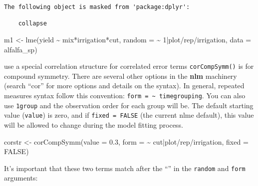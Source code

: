 \documentclass[
  letterpaper,
  DIV=11,
  numbers=noendperiod]{scrreprt}
\newenvironment{Shaded}{\begin{snugshade}}{\end{snugshade}}
\newcommand{\AttributeTok}[1]{\textcolor[rgb]{0.40,0.45,0.13}{#1}}
\newcommand{\ConstantTok}[1]{\textcolor[rgb]{0.56,0.35,0.01}{#1}}
\newcommand{\DecValTok}[1]{\textcolor[rgb]{0.68,0.00,0.00}{#1}}
\newcommand{\FloatTok}[1]{\textcolor[rgb]{0.68,0.00,0.00}{#1}}
\newcommand{\FunctionTok}[1]{\textcolor[rgb]{0.28,0.35,0.67}{#1}}
\newcommand{\NormalTok}[1]{\textcolor[rgb]{0.00,0.23,0.31}{#1}}
\newcommand{\OtherTok}[1]{\textcolor[rgb]{0.00,0.23,0.31}{#1}}
\newcommand{\SpecialCharTok}[1]{\textcolor[rgb]{0.37,0.37,0.37}{#1}}
\begin{document}
\begin{verbatim}
The following object is masked from 'package:dplyr':

    collapse
\end{verbatim}

\begin{Shaded}
\begin{Highlighting}[]
\NormalTok{m1 }\OtherTok{\textless{}{-}} \FunctionTok{lme}\NormalTok{(yield }\SpecialCharTok{\textasciitilde{}}\NormalTok{ mix}\SpecialCharTok{*}\NormalTok{irrigation}\SpecialCharTok{*}\NormalTok{cut,}
          \AttributeTok{random =} \SpecialCharTok{\textasciitilde{}} \DecValTok{1}\SpecialCharTok{|}\NormalTok{plot}\SpecialCharTok{/}\NormalTok{rep}\SpecialCharTok{/}\NormalTok{irrigation,}
          \AttributeTok{data =}\NormalTok{ alfalfa\_sp)}
\end{Highlighting}
\end{Shaded}

use a special correlation structure for correlated error terms
\texttt{corCompSymm()} is for compound symmetry. There are several other
options in the \textbf{nlm} machinery (search ``cor'' for more options
and details on the syntax). In general, repeated measures syntax follow
this convention:
\texttt{form\ =\ \textasciitilde{}\ time\textbar{}grouping}. You can
also use \texttt{1\textbar{}group} and the observation order for each
group will be. The default starting value (\texttt{value}) is zero, and
if \texttt{fixed\ =\ FALSE} (the current nlme default), this value will
be allowed to change during the model fitting process.

\begin{Shaded}
\begin{Highlighting}[]
\NormalTok{corstr }\OtherTok{\textless{}{-}} \FunctionTok{corCompSymm}\NormalTok{(}\AttributeTok{value =} \FloatTok{0.3}\NormalTok{, }
                      \AttributeTok{form =} \SpecialCharTok{\textasciitilde{}}\NormalTok{ cut}\SpecialCharTok{|}\NormalTok{plot}\SpecialCharTok{/}\NormalTok{rep}\SpecialCharTok{/}\NormalTok{irrigation,}
                      \AttributeTok{fixed =} \ConstantTok{FALSE}\NormalTok{)}
\end{Highlighting}
\end{Shaded}

It's important that these two terms match after the ``\textbar{}'' in
the \texttt{random} and \texttt{form} arguments:
\end{document}

